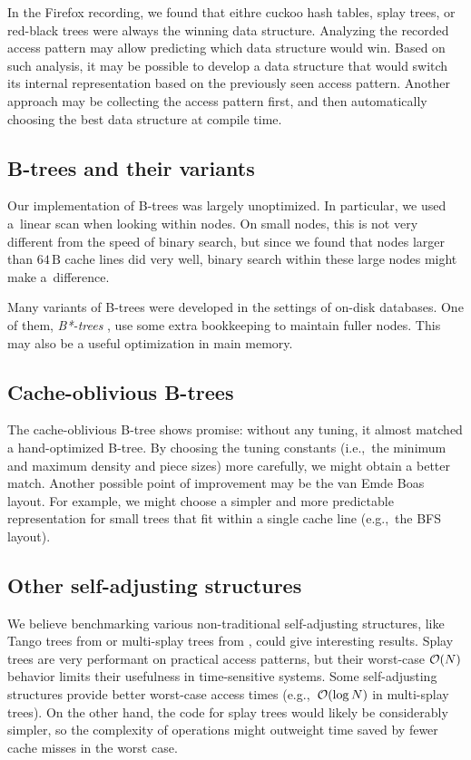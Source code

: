 In the Firefox recording, we found that eithre cuckoo hash tables, splay trees,
or red-black trees were always the winning data structure. Analyzing the
recorded access pattern may allow predicting which data structure would win.
Based on such analysis, it may be possible to develop a data structure that
would switch its internal representation based on the previously seen access
pattern. Another approach may be collecting the access pattern first, and
then automatically choosing the best data structure at compile time.

\subsection*{B-trees and their variants}
Our implementation of \mbox{B-trees} was largely unoptimized. In particular,
we used a~linear scan when looking within nodes. On small nodes, this is
not very different from the speed of binary search, but since we found
that nodes larger than $64\,\text{B}$ cache lines did very well, binary search
within these large nodes might make a~difference.

Many variants of B-trees were developed in the settings of on-disk databases.
One of them, \emph{B*-trees} \cite{bstar}, use some extra bookkeeping to
maintain fuller nodes. This may also be a useful optimization in main memory.

\subsection*{Cache-oblivious B-trees}
The cache-oblivious B-tree shows promise: without any tuning, it almost
matched a hand-optimized B-tree. By choosing the tuning constants (i.e.,\ the
minimum and maximum density and piece sizes) more carefully, we might obtain
a better match. Another possible point of improvement may be the van Emde Boas
layout. For example, we might choose a simpler and more predictable
representation for small trees that fit within a single cache line
(e.g.,\ the BFS layout).

\subsection*{Other self-adjusting structures}
We believe benchmarking various non-traditional self-adjusting structures,
like Tango trees from \cite{tango} or multi-splay trees from
\cite{multisplay-trees}, could give interesting results. Splay trees are very
performant on practical access patterns, but their worst-case $\mathcal{O}(N)$ behavior
limits their usefulness in time-sensitive systems. Some self-adjusting
structures provide better worst-case access times (e.g.,\ $\mathcal{O}(\log N)$ in
multi-splay trees). On the other hand, the code for splay trees would
likely be considerably simpler, so the complexity of operations might outweight
time saved by fewer cache misses in the worst case.

